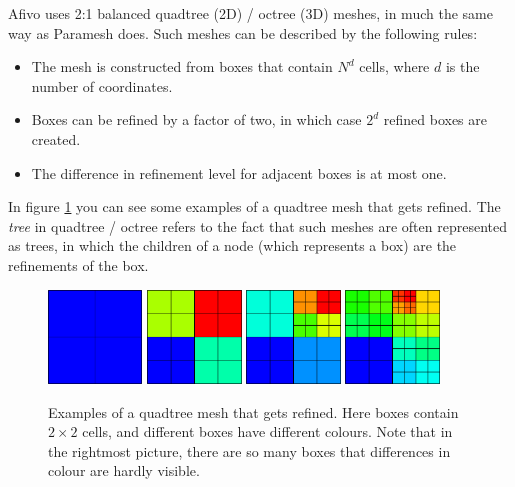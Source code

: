 \documentclass[a4paper, a4wide]{article}
\begin{document}
Afivo uses 2:1 balanced quadtree (2D) / octree (3D) meshes, in much the same way
as Paramesh does.
Such meshes can be described by the following rules:

\begin{itemize}
  \item The mesh is constructed from boxes that contain $N^d$ cells, where $d$
  is the number of coordinates.
  \item Boxes can be refined by a factor of two, in which case $2^d$ refined
  boxes are created.
  \item The difference in refinement level for adjacent boxes is at most one.
\end{itemize}

In figure \ref{fig:example-quadtree} you can see some examples of a quadtree
mesh that gets refined.
The \emph{tree} in quadtree / octree refers to the fact that such meshes are
often represented as trees, in which the children of a node (which represents a
box) are the refinements of the box.

\begin{figure}
  \centering
  \includegraphics[width=2.5cm]{figures/quadtree_cex1.png}
  \includegraphics[width=2.5cm]{figures/quadtree_cex2.png}
  \includegraphics[width=2.5cm]{figures/quadtree_cex3.png}
  \includegraphics[width=2.5cm]{figures/quadtree_cex4.png}
  \caption{Examples of a quadtree mesh that gets refined.
    Here boxes contain $2 \times 2$ cells, and different boxes have different
    colours. Note that in the rightmost picture, there are so many boxes that
    differences in colour are hardly visible.}
  \label{fig:example-quadtree}
\end{figure}
\end{document}
